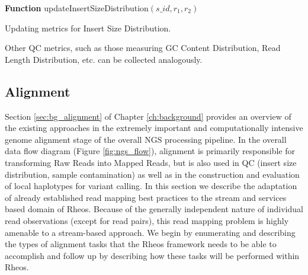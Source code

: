 \begin{algorithm2e}[h]
    \DontPrintSemicolon
    \footnotesize
    \textbf{Function} {\sc updateInsertSizeDistribution}$(s\_id, r_1,r_2)$
    \caption{Updating metrics for Insert Size Distribution.}\label{ag:update_metrics_isd}
\end{algorithm2e}

Other QC metrics, such as those measuring GC Content Distribution, Read Length Distribution, etc. can be collected analogously. 

\subsection{Alignment}

Section \ref{sec:bg_alignment} of Chapter \ref{ch:background} provides an overview of the existing approaches in the extremely important and computationally intensive genome alignment stage of the overall NGS processing pipeline. In the overall data flow diagram (Figure \ref{fig:ngs_flow}), alignment is primarily responsible for transforming Raw Reads into Mapped Reads, but is also used in QC (insert size distribution, sample contamination) as well as in the construction and evaluation of local haplotypes for variant calling. In this section we describe the adaptation of already established read mapping best practices to the stream and services based domain of Rheos. Because of the generally independent nature of individual read observations (except for read pairs), this read mapping problem is highly amenable to a stream-based approach. We begin by enumerating and describing the types of alignment tasks that the Rheos framework needs to be able to accomplish and follow up by describing how these tasks will be performed within Rheos.

